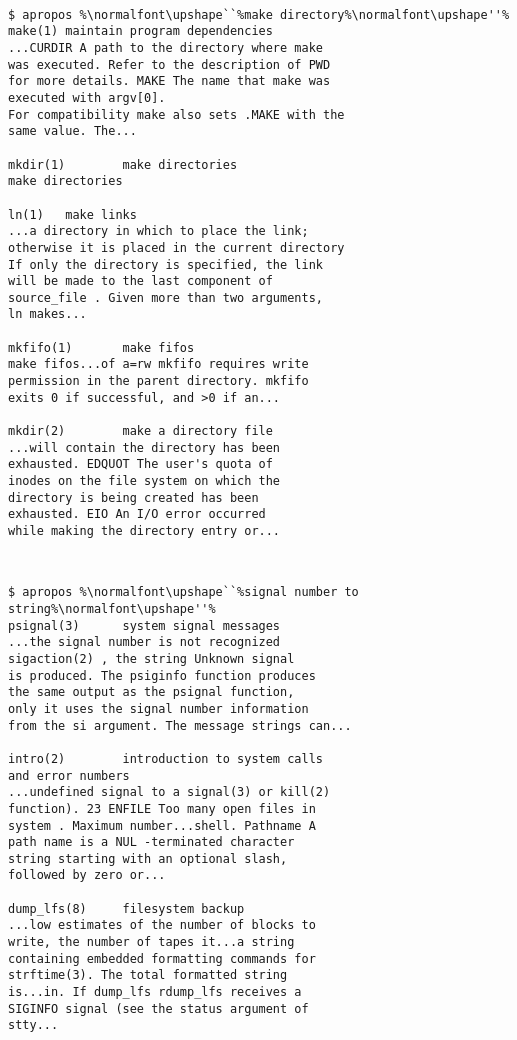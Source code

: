 \documentclass[letterpaper,twocolumn,10pt]{article}
\begin{document}
{\tt \small
{}
\begin{lstlisting}
$ apropos %\normalfont\upshape``%make directory%\normalfont\upshape''%
make(1) maintain program dependencies
...CURDIR A path to the directory where make
was executed. Refer to the description of PWD
for more details. MAKE The name that make was
executed with argv[0].
For compatibility make also sets .MAKE with the
same value. The...

mkdir(1)        make directories
make directories

ln(1)   make links
...a directory in which to place the link;
otherwise it is placed in the current directory
If only the directory is specified, the link
will be made to the last component of
source_file . Given more than two arguments,
ln makes...

mkfifo(1)       make fifos
make fifos...of a=rw mkfifo requires write
permission in the parent directory. mkfifo
exits 0 if successful, and >0 if an...

mkdir(2)        make a directory file
...will contain the directory has been
exhausted. EDQUOT The user's quota of
inodes on the file system on which the
directory is being created has been
exhausted. EIO An I/O error occurred
while making the directory entry or...
\end{lstlisting}
}

{\tt \small
{}
\begin{lstlisting}
$ apropos %\normalfont\upshape``%signal number to string%\normalfont\upshape''%
psignal(3)      system signal messages
...the signal number is not recognized
sigaction(2) , the string Unknown signal
is produced. The psiginfo function produces
the same output as the psignal function,
only it uses the signal number information
from the si argument. The message strings can...

intro(2)        introduction to system calls
and error numbers
...undefined signal to a signal(3) or kill(2)
function). 23 ENFILE Too many open files in
system . Maximum number...shell. Pathname A
path name is a NUL -terminated character
string starting with an optional slash,
followed by zero or...

dump_lfs(8)     filesystem backup
...low estimates of the number of blocks to
write, the number of tapes it...a string
containing embedded formatting commands for
strftime(3). The total formatted string
is...in. If dump_lfs rdump_lfs receives a
SIGINFO signal (see the status argument of
stty...
\end{lstlisting}
}
\end{document}

